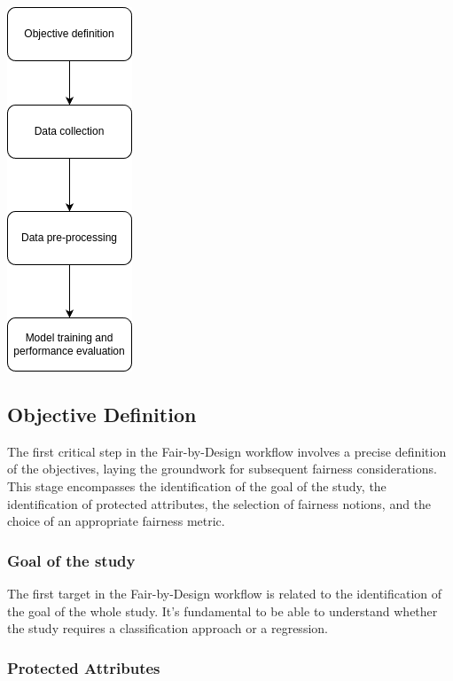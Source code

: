 \begin{center}
    \includegraphics[width=.3\textwidth, height=.8\textwidth]{workflow-steps.png}
\end{center}
    


\subsection{Objective Definition}
\label{subsection:objective}

The first critical step in the Fair-by-Design workflow involves a precise definition of the objectives, laying the groundwork for subsequent fairness considerations. This stage encompasses the identification of the goal of the study, the identification of protected attributes, the selection of fairness notions, and the choice of an appropriate fairness metric.

\subsubsection{Goal of the study}

The first target in the Fair-by-Design workflow is related to the identification of the goal of the whole study. It's fundamental to be able to understand whether the study requires a classification approach or a regression.


\subsubsection{Protected Attributes}

